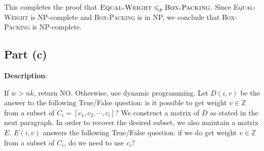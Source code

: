 \documentclass{article}
\begin{document}
This completes the proof that $\textsc{Equal-Weight}\leqslant_p\textsc{Box-Packing}$. Since \textsc{Equal-Weight} is NP-complete and \textsc{Box-Packing} is in NP, we conclude that \textsc{Box-Packing} is NP-complete.

\subsection{Part (c)}
\noindent\textbf{Description}:

If $w>nk$, return NO. Otherwise, use dynamic programming. Let $D(i,v)$ be the answer to the following True/False question: is it possible to get weight $v\in\mathbb{Z}$ from a subset of $C_i=[c_1,c_2,\cdots,c_i]$? We construct a matrix of $D$ as stated in the next paragraph. In order to recover the desired subset, we also maintain a matrix $E$. $E(i,v)$ answers the following True/False question: if we do get weight $v\in\mathbb{Z}$ from a subset of $C_i$, do we need to use $c_i$?
\end{document}
